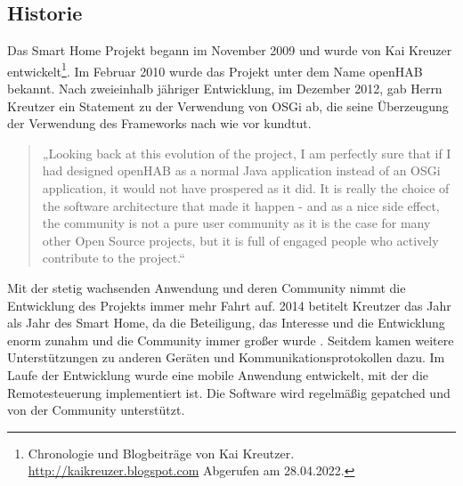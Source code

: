 \subsection*{Historie}
\label{sec:historyoHAB}
    Das Smart Home Projekt begann im November 2009 und wurde von Kai Kreuzer entwickelt\footnote{Chronologie und Blogbeiträge von Kai Kreutzer. \url{http://kaikreuzer.blogspot.com} Abgerufen am 28.04.2022.}. 
    Im Februar 2010 wurde das Projekt unter dem Name openHAB bekannt. Nach zweieinhalb jähriger Entwicklung, im Dezember 2012, 
    gab Herrn Kreutzer ein Statement zu der Verwendung von OSGi ab, die seine Überzeugung der Verwendung des Frameworks nach wie 
    vor kundtut.
    \begin{quote}
        „Looking back at this evolution of the project, I am perfectly sure that if I had designed openHAB as a normal Java 
        application instead of an OSGi application, it would not have prospered as it did. It is really the choice of the 
        software architecture that made it happen - and as a nice side effect, the community is not a pure user community 
        as it is the case for many other Open Source projects, but it is full of engaged people who actively contribute to the 
        project.\cite{kaikreutzer2012}“
    \end{quote} 
Mit der stetig wachsenden Anwendung und deren Community nimmt die Entwicklung des Projekts immer mehr Fahrt auf. 2014 betitelt 
Kreutzer das Jahr als Jahr des Smart Home, da die Beteiligung, das Interesse und die Entwicklung enorm zunahm und die Community immer 
großer wurde \cite{kaikreutzer2014}. Seitdem kamen weitere Unterstützungen zu anderen Geräten und 
Kommunikationsprotokollen dazu. Im Laufe der Entwicklung wurde eine mobile Anwendung entwickelt, mit der die Remotesteuerung 
implementiert ist. Die Software wird regelmäßig gepatched und von der Community unterstützt.

